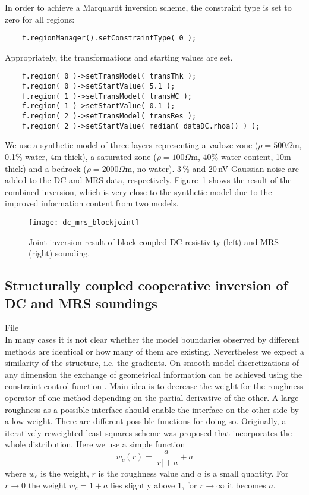 In order to achieve a Marquardt inversion scheme, the constraint type is set to zero for all regions:
\begin{lstlisting}
    f.regionManager().setConstraintType( 0 );
\end{lstlisting}
Appropriately, the transformations and starting values are set.
\begin{lstlisting}
    f.region( 0 )->setTransModel( transThk );
    f.region( 0 )->setStartValue( 5.1 );
    f.region( 1 )->setTransModel( transWC );
    f.region( 1 )->setStartValue( 0.1 );
    f.region( 2 )->setTransModel( transRes );
    f.region( 2 )->setStartValue( median( dataDC.rhoa() ) );
\end{lstlisting}

We use a synthetic model of three layers representing a vadoze zone ($\rho=500\Omega$m, 0.1\% water, 4m thick), a saturated zone ($\rho=100\Omega$m, 40\% water content, 10m thick) and a bedrock ($\rho=2000\Omega$m, no water).
3\,\% and 20\,nV Gaussian noise are added to the DC and MRS data, respectively.
Figure~\ref{fig:blockjoint} shows the result of the combined inversion, which is very close to the synthetic model due to the improved information content from two models.

\begin{figure}[htb]
\centering\texttt{[image: dc\_mrs\_blockjoint]}
\caption{Joint inversion result of block-coupled DC resistivity (left) and MRS (right) sounding.}\label{fig:blockjoint}
\end{figure}


\subsection{Structurally coupled cooperative inversion of DC and MRS soundings}\label{sec:structjoint}
File \\
In many cases it is not clear whether the model boundaries observed by different methods are identical or how many of them are existing.
Nevertheless we expect a similarity of the structure, i.e. the gradients.
On smooth model discretizations of any dimension the exchange of geometrical information can be achieved using the constraint control function \citep{guerue06nearsurface}.
Main idea is to decrease the weight for the roughness operator of one method depending on the partial derivative of the other.
A large roughness as a possible interface should enable the interface on the other side by a low weight.
There are different possible functions for doing so.
Originally, a iteratively reweighted least squares scheme was proposed that incorporates the whole distribution.
Here we use a simple function
\begin{equation}
    w_c(r) = \frac{a}{|r|+a}+a
\end{equation}
where $w_c$ is the weight, $r$ is the roughness value and $a$ is a small quantity.
For $r\rightarrow 0$ the weight $w_c=1+a$ lies slightly above 1, for $r\rightarrow\infty$ it becomes $a$.


